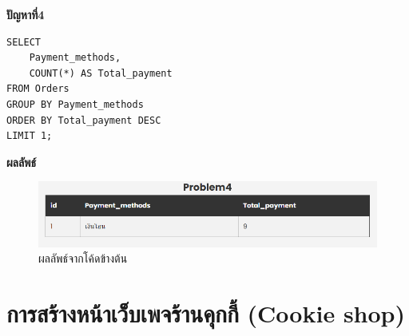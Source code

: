 \documentclass{report}
\begin{document}
\par
\textbf{ปัญหาที่4} 
\begin{verbatim}
SELECT
	Payment_methods,
	COUNT(*) AS Total_payment
FROM Orders 
GROUP BY Payment_methods
ORDER BY Total_payment DESC
LIMIT 1;
\end{verbatim}
\textbf{ผลลัพธ์}
\raggedright\begin{figure}[!ht]
    \centering
    \includegraphics[scale=0.55]{q4.png}
    \caption{ผลลัพธ์จากโค้ดข้างต้น} 
\label{fig:mesh2}
\end{figure}

\chapter{การสร้างหน้าเว็บเพจร้านคุกกี้ (Cookie shop)}
\end{document}
